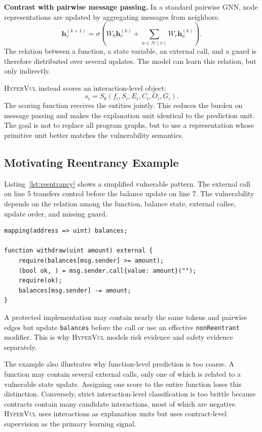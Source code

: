 \documentclass[conference]{IEEEtran}
\newcommand{\tool}{\textsc{HyperVul}}
\begin{document}
\textbf{Contrast with pairwise message passing.} In a standard pairwise GNN, node representations are updated by aggregating messages from neighbors:
\begin{equation}
\mathbf{h}_v^{(k+1)}=\sigma\left(W_0\mathbf{h}_v^{(k)}+
\sum_{u\in\mathcal{N}(v)}W_r\mathbf{h}_u^{(k)}\right).
\end{equation}
The relation between a function, a state variable, an external call, and a guard is therefore distributed over several updates. The model can learn this relation, but only indirectly.

\tool{} instead scores an interaction-level object:
\begin{equation}
s_i=S_{\theta}(f_i,S_i,E_i,C_i,O_i,G_i).
\end{equation}
The scoring function receives the entities jointly. This reduces the burden on message passing and makes the explanation unit identical to the prediction unit. The goal is not to replace all program graphs, but to use a representation whose primitive unit better matches the vulnerability semantics.

\subsection{Motivating Reentrancy Example}

Listing~\ref{lst:reentrancy} shows a simplified vulnerable pattern. The external call on line 5 transfers control before the balance update on line 7. The vulnerability depends on the relation among the function, balance state, external callee, update order, and missing guard.

\begin{lstlisting}[style=solidity,caption={Simplified reentrancy pattern.},label={lst:reentrancy}]
mapping(address => uint) balances;

function withdraw(uint amount) external {
    require(balances[msg.sender] >= amount);
    (bool ok, ) = msg.sender.call{value: amount}("");
    require(ok);
    balances[msg.sender] -= amount;
}
\end{lstlisting}

A protected implementation may contain nearly the same tokens and pairwise edges but update \texttt{balances} before the call or use an effective \texttt{nonReentrant} modifier. This is why \tool{} models risk evidence and safety evidence separately.

The example also illustrates why function-level prediction is too coarse. A function may contain several external calls, only one of which is related to a vulnerable state update. Assigning one score to the entire function loses this distinction. Conversely, strict interaction-level classification is too brittle because contracts contain many candidate interactions, most of which are negative. \tool{} uses interactions as explanation units but uses contract-level supervision as the primary learning signal.
\end{document}
